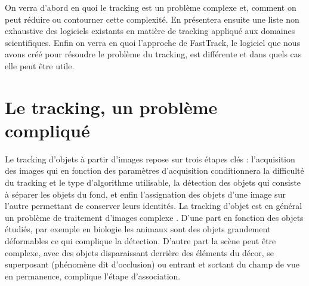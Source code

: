 \medbreak
  On verra d'abord en quoi le tracking est un problème complexe et, comment on peut réduire ou contourner cette complexité. En présentera ensuite une liste non exhaustive des logiciels existants en matière de tracking appliqué aux domaines scientifiques. Enfin on verra en quoi l'approche de FastTrack, le logiciel que nous avons créé pour résoudre le problème du tracking, est différente et dans quels cas elle peut être utile.


	\section{Le tracking, un problème compliqué}
  Le tracking d'objets à partir d'images repose sur trois étapes clés : l'acquisition des images qui en fonction des paramètres d'acquisition conditionnera la difficulté du tracking et le type d'algorithme utilisable, la détection des objets qui consiste à séparer les objets du fond, et enfin l'assignation des objets d'une image sur l'autre permettant de conserver leurs identités. La tracking d'objet est en général un problème de traitement d'images complexe \cite{dell2014automated}. D'une part en fonction des objets étudiés, par exemple en biologie les animaux sont des objets grandement déformables ce qui complique la détection. D'autre part la scène peut être complexe, avec des objets disparaissant derrière des éléments du décor, se superposant (phénomène dit d'occlusion) ou entrant et sortant du champ de vue en permanence, complique l'étape d'association.
\medbreak
  
